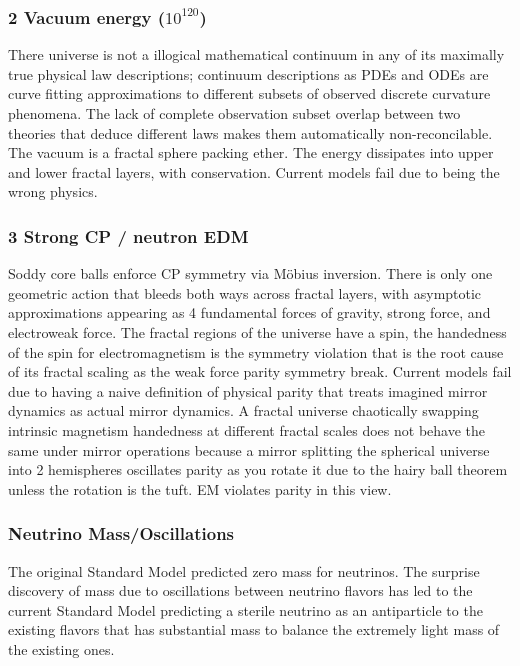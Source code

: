 \documentclass[11pt,a4paper]{article}
\begin{document}
    \subsubsection{
    2 Vacuum energy ($10^{120}$)
    }
      There universe is not a illogical mathematical continuum in any of its maximally true physical law descriptions; continuum descriptions as PDEs and ODEs are curve fitting approximations to different subsets of observed discrete curvature phenomena. The lack of complete observation subset overlap between two theories that deduce different laws makes them automatically non-reconcilable. The vacuum is a fractal sphere packing ether. The energy dissipates into upper and lower fractal layers, with conservation. Current models fail due to being the wrong physics.

    \subsubsection{
    3 Strong CP / neutron EDM 
    }
      Soddy core balls enforce CP symmetry via Möbius inversion. There is only one geometric action that bleeds both ways across fractal layers, with asymptotic approximations appearing as 4 fundamental forces of gravity, strong force, and electroweak force. The fractal regions of the universe have a spin, the handedness of the spin for electromagnetism is the symmetry violation that is the root cause of its fractal scaling as the weak force parity symmetry break. Current models fail due to having a naive definition of physical parity that treats imagined mirror dynamics as actual mirror dynamics. A fractal universe chaotically swapping intrinsic magnetism handedness at different fractal scales does not behave the same under mirror operations because a mirror splitting the spherical universe into 2 hemispheres oscillates  parity as you rotate it due to the hairy ball theorem unless the rotation is the tuft. EM violates parity in this view.

    \subsubsection
    { Neutrino Mass/Oscillations
    }

      The original Standard Model predicted zero mass for neutrinos. The surprise discovery of mass due to oscillations between neutrino flavors has led to the current Standard Model predicting a sterile neutrino as an antiparticle to the existing flavors that has substantial mass to balance the extremely light mass of the existing ones.
\end{document}
